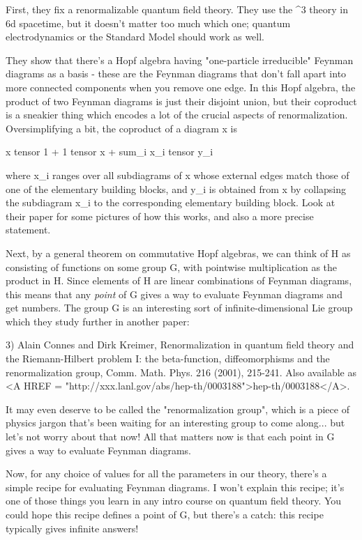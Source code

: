 First, they fix a renormalizable quantum field theory.  They use the
\phi ^3 theory in 6d spacetime, but it doesn't matter too much which
one; quantum electrodynamics or the Standard Model should work as well. 

They show that there's a Hopf algebra having "one-particle irreducible"
Feynman diagrams as a basis - these are the Feynman diagrams that don't
fall apart into more connected components when you remove one edge.
In this Hopf algebra, the product of two Feynman diagrams is just their 
disjoint union, but their coproduct is a sneakier thing which encodes a 
lot of the crucial aspects of renormalization.  Oversimplifying a bit, 
the coproduct of a diagram x is

x tensor 1 + 1 tensor x + sum_{i} x_{i} tensor y_{i}

where x_{i} ranges over all subdiagrams of x whose external edges
match those of one of the elementary building blocks, and y_{i} is
obtained from x by collapsing the subdiagram x_{i} to the corresponding
elementary building block.  Look at their paper for some pictures of
how this works, and also a more precise statement. 

Next, by a general theorem on commutative Hopf algebras, we can think
of H as consisting of functions on some group G, with pointwise 
multiplication as the product in H.  Since elements of H are linear 
combinations of Feynman diagrams, this means that any \emph{point} of G 
gives a way to evaluate Feynman diagrams and get numbers.   The group
G is an interesting sort of infinite-dimensional Lie group which they
study further in another paper:

3) Alain Connes and Dirk Kreimer, Renormalization in quantum field 
theory and the Riemann-Hilbert problem I: the beta-function, 
diffeomorphisms and the renormalization group, Comm. Math. Phys. 
216 (2001), 215-241.  Also available as <A HREF = "http://xxx.lanl.gov/abs/hep-th/0003188">hep-th/0003188</A>.

It may even deserve to be called the "renormalization group", which
is a piece of physics jargon that's been waiting for an interesting group to
come along... but let's not worry about that now!  All that matters now is that
each point in G gives a way to evaluate Feynman diagrams.  

Now, for any choice of values for all the parameters in our theory, 
there's a simple recipe for evaluating Feynman diagrams.  I won't
explain this recipe; it's one of those things you learn in any intro 
course on quantum field theory.  You could hope this recipe defines a 
point of G, but there's a catch: this recipe typically gives infinite
answers!  

